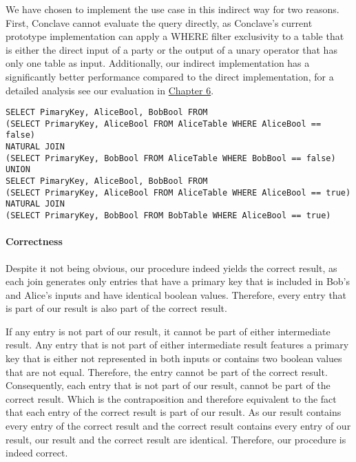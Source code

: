 We have chosen to implement the use case in this indirect way for two reasons. First, Conclave cannot evaluate the query directly, as Conclave's current prototype implementation can apply a WHERE filter exclusivity to a table that is either the direct input of a party or the output of a unary operator that has only one table as input. Additionally, our indirect implementation has a significantly better performance compared to the direct implementation, for a detailed analysis see our evaluation in \hyperref[evaluation]{Chapter 6}.   


\label{use_case2_alternative_sql}
\begin{lstlisting}[caption={Functional equivalent SQL statement for our optimitized implementation of our second use case}]
SELECT PimaryKey, AliceBool, BobBool FROM
(SELECT PrimaryKey, AliceBool FROM AliceTable WHERE AliceBool == false) 
NATURAL JOIN	
(SELECT PrimaryKey, BobBool FROM AliceTable WHERE BobBool == false)	
UNION
SELECT PimaryKey, AliceBool, BobBool FROM
(SELECT PrimaryKey, AliceBool FROM AliceTable WHERE AliceBool == true) 
NATURAL JOIN	
(SELECT PrimaryKey, BobBool FROM BobTable WHERE AliceBool == true)
\end{lstlisting}

\paragraph{Correctness}
Despite it not being obvious, our procedure indeed yields the correct result, as each join generates only entries that have a primary key that is included in Bob's and Alice's inputs and have identical boolean values. Therefore, every entry that is part of our result is also part of the correct result.

If any entry is not part of our result, it cannot be part of either intermediate result. Any entry that is not part of either intermediate result features a primary key that is either not represented in both inputs or contains two boolean values that are not equal.
Therefore, the entry cannot be part of the correct result. Consequently, each entry that is not part of our result, cannot be part of the correct result. Which is the contraposition and therefore equivalent to the fact that each entry of the correct result is part of our result. 
As our result contains every entry of the correct result and the correct result contains every entry of our result, our result and the correct result are identical. Therefore, our procedure is indeed correct.

